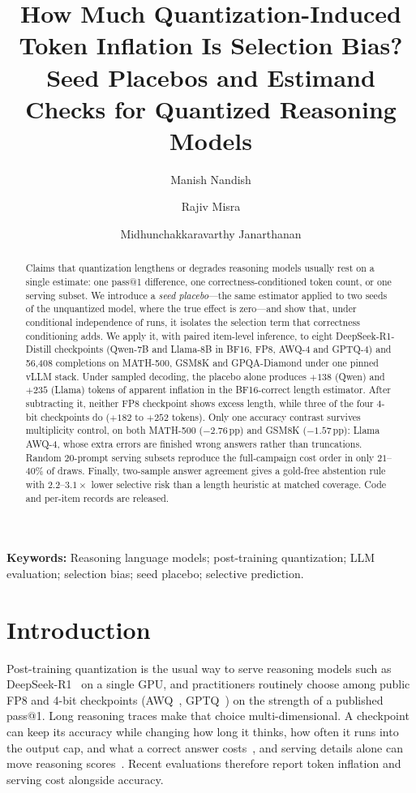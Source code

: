 \documentclass[11pt,a4paper]{article}
\title{\textbf{How Much Quantization-Induced Token Inflation Is Selection Bias? Seed Placebos and Estimand Checks for Quantized Reasoning Models}}
\author[1,2]{Manish Nandish}
\author[1]{Rajiv Misra}
\author[2]{Midhunchakkaravarthy Janarthanan}
\affil[1]{Department of Computer Science and Engineering, Indian Institute of Technology Patna, Patna, Bihar, India\\
\texttt{manish\_25s21res58@iitp.ac.in}, \texttt{rajivm@iitp.ac.in}}
\affil[2]{Lincoln University College, Malaysia\\
\texttt{midhun@lincoln.edu.my}}
\date{}
\begin{document}
\maketitle

\begin{abstract}
Claims that quantization lengthens or degrades reasoning models usually rest on a single estimate: one pass@1 difference, one correctness-conditioned token count, or one serving subset. We introduce a \emph{seed placebo}---the same estimator applied to two seeds of the unquantized model, where the true effect is zero---and show that, under conditional independence of runs, it isolates the selection term that correctness conditioning adds. We apply it, with paired item-level inference, to eight DeepSeek-R1-Distill checkpoints (Qwen-7B and Llama-8B in BF16, FP8, AWQ-4 and GPTQ-4) and 56{,}408 completions on MATH-500, GSM8K and GPQA-Diamond under one pinned vLLM stack. Under sampled decoding, the placebo alone produces $+138$ (Qwen) and $+235$ (Llama) tokens of apparent inflation in the BF16-correct length estimator. After subtracting it, neither FP8 checkpoint shows excess length, while three of the four 4-bit checkpoints do ($+182$ to $+252$ tokens). Only one accuracy contrast survives multiplicity control, on both MATH-500 ($-2.76$\,pp) and GSM8K ($-1.57$\,pp): Llama AWQ-4, whose extra errors are finished wrong answers rather than truncations. Random 20-prompt serving subsets reproduce the full-campaign cost order in only $21$--$40\%$ of draws. Finally, two-sample answer agreement gives a gold-free abstention rule with $2.2$--$3.1\times$ lower selective risk than a length heuristic at matched coverage. Code and per-item records are released.
\end{abstract}

\vspace{0.6em}
\noindent\textbf{Keywords:} Reasoning language models; post-training quantization; LLM evaluation; selection bias; seed placebo; selective prediction.

\section{Introduction}
\label{sec:intro}
Post-training quantization is the usual way to serve reasoning models such as DeepSeek-R1~\cite{guo2025deepseekr1} on a single GPU, and practitioners routinely choose among public FP8 and 4-bit checkpoints (AWQ~\cite{lin2023awq}, GPTQ~\cite{frantar2022gptq}) on the strength of a published pass@1. Long reasoning traces make that choice multi-dimensional. A checkpoint can keep its accuracy while changing how long it thinks, how often it runs into the output cap, and what a correct answer costs~\cite{lian2026quantinflates,liu2025qrm,lotfi2026overthinking,erol2025costofpass,kurtic2025give}, and serving details alone can move reasoning scores~\cite{hochlehnert2025sober}. Recent evaluations therefore report token inflation and serving cost alongside accuracy.
\end{document}
